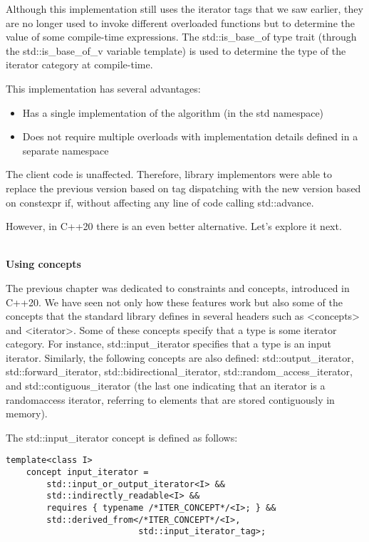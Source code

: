 Although this implementation still uses the iterator tags that we saw earlier, they are no longer used to invoke different overloaded functions but to determine the value of some compile-time expressions. The std::is\_base\_of type trait (through the std::is\_base\_of\_v variable template) is used to determine the type of the iterator category at compile-time.

This implementation has several advantages:

\begin{itemize}
\item
Has a single implementation of the algorithm (in the std namespace)

\item
Does not require multiple overloads with implementation details defined in a separate namespace
\end{itemize}

The client code is unaffected. Therefore, library implementors were able to replace the previous version based on tag dispatching with the new version based on constexpr if, without affecting any line of code calling std::advance.

However, in C++20 there is an even better alternative. Let’s explore it next.

\noindent
\hspace*{\fill} \\ %
\textbf{Using concepts}

The previous chapter was dedicated to constraints and concepts, introduced in C++20. We have seen not only how these features work but also some of the concepts that the standard library defines in several headers such as <concepts> and <iterator>. Some of these concepts specify that a type is some iterator category. For instance, std::input\_iterator specifies that a type is an input iterator. Similarly, the following concepts are also defined: std::output\_iterator, std::forward\_iterator, std::bidirectional\_iterator, std::random\_access\_iterator, and std::contiguous\_iterator (the last one indicating that an iterator is a randomaccess iterator, referring to elements that are stored contiguously in memory).

The std::input\_iterator concept is defined as follows:

\begin{lstlisting}[style=styleCXX]
template<class I>
	concept input_iterator =
		std::input_or_output_iterator<I> &&
		std::indirectly_readable<I> &&
		requires { typename /*ITER_CONCEPT*/<I>; } &&
		std::derived_from</*ITER_CONCEPT*/<I>,
						  std::input_iterator_tag>;
\end{lstlisting}

